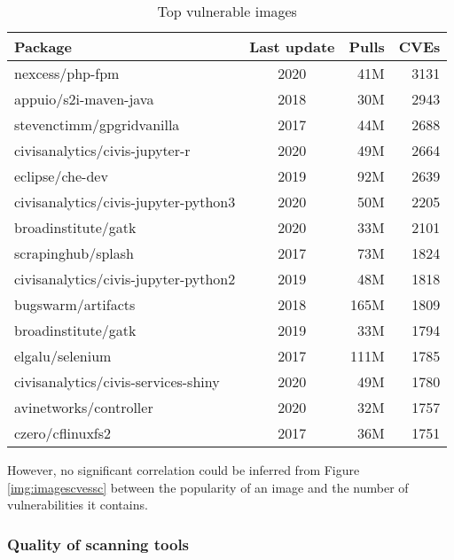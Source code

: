 
\begin{table}[htb]
\centering
\begin{tabular}{lcrr} \toprule
    \textbf{Package} & \textbf{Last update} & \textbf{Pulls} & \textbf{CVEs} \\ \midrule
        nexcess/php-fpm & 2020 & 41M & 3131 \\
        appuio/s2i-maven-java & 2018 & 30M & 2943 \\
        stevenctimm/gpgridvanilla & 2017 & 44M & 2688 \\
        civisanalytics/civis-jupyter-r & 2020 & 49M & 2664 \\
        eclipse/che-dev & 2019 & 92M & 2639 \\
        civisanalytics/civis-jupyter-python3 & 2020 & 50M & 2205 \\
        broadinstitute/gatk & 2020 & 33M & 2101 \\
        scrapinghub/splash & 2017 & 73M & 1824 \\
        civisanalytics/civis-jupyter-python2 & 2019 & 48M & 1818 \\
        bugswarm/artifacts & 2018 & 165M & 1809 \\
        broadinstitute/gatk & 2019 & 33M & 1794 \\
        elgalu/selenium & 2017 & 111M & 1785 \\
        civisanalytics/civis-services-shiny & 2020 & 49M & 1780 \\
        avinetworks/controller & 2020 & 32M & 1757 \\
        czero/cflinuxfs2 & 2017 & 36M & 1751 \\ \bottomrule
\end{tabular}
\caption{Top vulnerable images}
\label{tab:imagescve}
\end{table}

However, no significant correlation could be inferred from Figure \ref{img:imagescvessc} between the popularity of an image and the number of vulnerabilities it contains.


\FloatBarrier
\clearpage

\subsubsection{Quality of scanning tools}

